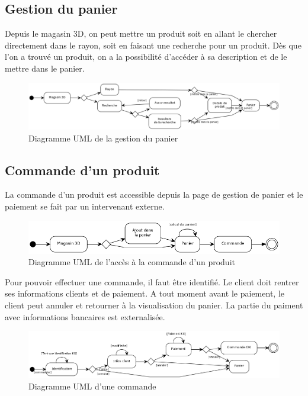 \documentclass[12pt]{article}
\begin{document}
\subsection{Gestion du panier}

Depuis le magasin 3D, on peut mettre un produit soit en allant le chercher directement dans le rayon,
soit en faisant une recherche pour un produit. Dès que l'on a trouvé un produit, on a la possibilité d'accéder
à sa description et de le mettre dans le panier.

\begin{figure}[ht]
    \center
    \includegraphics[scale=0.4]{../Diagrams/ActivityDiagrams/panier.png}
    \caption*{Diagramme UML de la gestion du panier}
\end{figure}

\subsection{Commande d'un produit}

La commande d'un produit est accessible depuis la page de gestion de panier et
le paiement se fait par un intervenant externe.

\begin{figure}[ht]
    \center
    \includegraphics[scale=0.55]{../Diagrams/ActivityDiagrams/commande_global.png}
    \caption*{Diagramme UML de l'accès à la commande d'un produit}
\end{figure}

Pour pouvoir effectuer une commande, il faut être identifié.
Le client doit rentrer ses informations clients et de paiement.
A tout moment avant le paiement, le client peut annuler et retourner à la visualisation du panier.
La partie du paiment avec informations bancaires est externalisée.

\begin{figure}[ht]
    \center
    \includegraphics[scale=0.45]{../Diagrams/ActivityDiagrams/commande_en_cours.png}
    \caption*{Diagramme UML d'une commande}
\end{figure}
\end{document}
